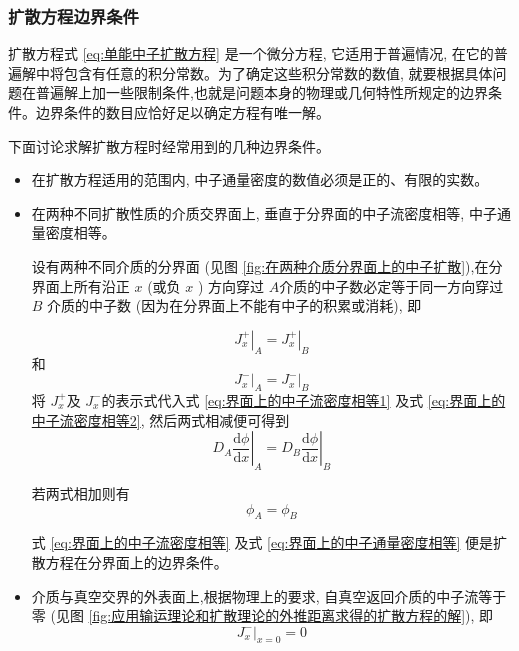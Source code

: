 \documentclass{Sichuan Normal University}
\begin{document}
\subsubsection*{扩散方程边界条件}
扩散方程式 \eqref{eq:单能中子扩散方程} 是一个微分方程, 它适用于普遍情况, 在它的普遍解中将包含有任意的积分常数。为了确定这些积分常数的数值, 就要根据具体问题在普遍解上加一些限制条件,也就是问题本身的物理或几何特性所规定的边界条件。边界条件的数目应恰好足以确定方程有唯一解。

下面讨论求解扩散方程时经常用到的几种边界条件。
\begin{itemize} 
    \item 在扩散方程适用的范围内, 中子通量密度的数值必须是正的、有限的实数。

    \item 在两种不同扩散性质的介质交界面上, 垂直于分界面的中子流密度相等, 中子通量密度相等。

设有两种不同介质的分界面 (见图 \ref{fig:在两种介质分界面上的中子扩散}),在分界面上所有沿正 $x$ (或负 $x$ ) 方向穿过 $A$介质的中子数必定等于同一方向穿过 $B$ 介质的中子数 (因为在分界面上不能有中子的积累或消耗), 即

\begin{equation}
\left.J_x^{+}\right|_A=\left.J_x^{+}\right|_B
\label{eq:界面上的中子流密度相等1}
\end{equation}
和
\begin{equation}
\left.J_x^{-}\right|_A=\left.J_x^{-}\right|_B
\label{eq:界面上的中子流密度相等2}
\end{equation}
将 $J_x^{+}$及 $J_x^{-}$的表示式代入式 \eqref{eq:界面上的中子流密度相等1} 及式 \eqref{eq:界面上的中子流密度相等2}, 然后两式相减便可得到
\begin{equation}
\left.D_A \frac{\mathrm{d} \phi}{\mathrm{d} x}\right|_A=\left.D_B \frac{\mathrm{d} \phi}{\mathrm{d} x}\right|_B
\label{eq:界面上的中子流密度相等}
\end{equation}

若两式相加则有
\begin{equation}
\phi_A=\phi_B
\label{eq:界面上的中子通量密度相等}
\end{equation}

式  \eqref{eq:界面上的中子流密度相等} 及式 \eqref{eq:界面上的中子通量密度相等} 便是扩散方程在分界面上的边界条件。

\item 介质与真空交界的外表面上,根据物理上的要求, 自真空返回介质的中子流等于零 (见图 \ref{fig:应用输运理论和扩散理论的外推距离求得的扩散方程的解}), 即
\begin{equation}
\left.J_x^{-}\right|_{x=0}=0
\end{equation}


\end{itemize}
\end{document}
